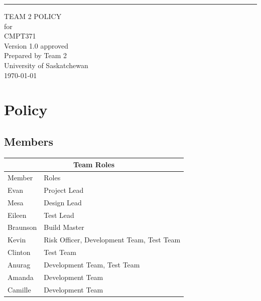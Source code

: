 \documentclass{scrreprt}
\date{}
\def\myversion{1.0 }
\begin{document}
\graphicspath{ {images/} }

\begin{flushright}
    \rule{16cm}{5pt}\vskip1cm
    \begin{bfseries}
        \Huge{TEAM 2 POLICY}\\
        \vspace{1.9cm}
        for\\
        \vspace{1.9cm}
        CMPT371\\
        \vspace{1.9cm}
        \LARGE{Version \myversion approved}\\
        \vspace{1.9cm}
        Prepared by Team 2\\
        \vspace{1.9cm}
        University of Saskatchewan\\
        \vspace{1.9cm}
        \today\\
    \end{bfseries}
\end{flushright}

\tableofcontents

\chapter{Policy}

\section{Members}

\begin{table}[h!]
\centering
\begin{tabular}{ |p{2cm}||p{8cm}|  }
    \hline
    \multicolumn{2}{|c|}{Team Roles} \\
    \hline
    Member & Roles\\
    \hline
    Evan & Project Lead\\
    Mesa & Design Lead\\
    Eileen & Test Lead\\
    Braunson & Build Master\\
    Kevin & Risk Officer, Development Team, Test Team\\
    Clinton & Test Team\\
    Anurag & Development Team, Test Team\\
    Amanda & Development Team\\
    Camille & Development Team\\
    \hline
\end{tabular}
\end{table}
\end{document}
